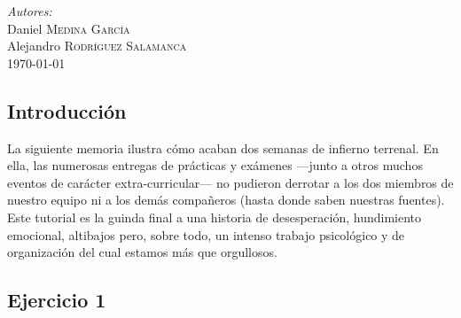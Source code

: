 \documentclass[12pt]{article}
\begin{document}
\begin{titlepage}


\emph{Autores:}\\
Daniel \textsc{Medina García}\\ %
Alejandro \textsc{Rodríguez Salamanca}\\[1.5cm] %


{\large \today}\\ %

\vfill %

\end{titlepage}

\tableofcontents

\newpage
\thispagestyle{empty}
\clearpage
\vspace*{\fill}
\begin{center}
    \begin{minipage}{\textwidth}
        \begin{center}
            \section*{Introducción}
            La siguiente memoria ilustra cómo acaban dos semanas de infierno terrenal. En ella, las numerosas entregas de prácticas y exámenes ---junto a otros muchos eventos de carácter extra-curricular--- no pudieron derrotar a los dos miembros de nuestro equipo ni a los demás compañeros (hasta donde saben nuestras fuentes). Este tutorial es la guinda final a una historia de desesperación, hundimiento emocional, altibajos pero, sobre todo, un intenso trabajo psicológico y de organización del cual estamos más que orgullosos.
        \end{center}
    \end{minipage}
\end{center}
\vfill

\newpage

\begin{center}
\section{Ejercicio 1}
\end{center}
\end{document}
